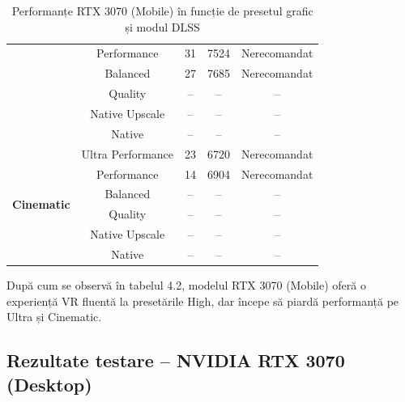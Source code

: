 \begin{table}[htbp]
\begin{tabular}{|c|c|c|c|c|}
 & Performance       & 31 & 7524 & Nerecomandat \\
 & Balanced          & 27 & 7685 & Nerecomandat \\
 & Quality           & -- & --   & -- \\
 & Native Upscale    & -- & --   & -- \\
 & Native            & -- & --   & -- \\
\hline
\multirow{6}{*}{\textbf{Cinematic}} & Ultra Performance & 23 & 6720 & Nerecomandat \\
 & Performance       & 14 & 6904 & Nerecomandat \\
 & Balanced          & -- & -- & -- \\
 & Quality           & -- & -- & -- \\
 & Native Upscale    & -- & -- & -- \\
 & Native            & -- & -- & -- \\
\hline
\end{tabular}
\caption{Performanțe RTX 3070 (Mobile) în funcție de presetul grafic și modul DLSS}
\label{tab:rtx3070}
\end{table}

După cum se observă în tabelul 4.2, modelul RTX 3070 (Mobile) oferă o experiență VR fluentă la presetările High, dar începe să piardă performanță pe Ultra și Cinematic.
\clearpage

\subsection*{Rezultate testare – NVIDIA RTX 3070 (Desktop)}

